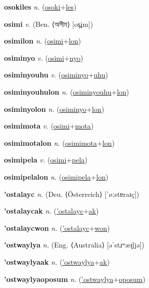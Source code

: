 \textbf{\hypertarget{osokiles}{osokiles}} \textit{n.} (\hyperlink{osoki}{osoki}+\allowbreak \hyperlink{les}{les})


\textbf{\hypertarget{osimi}{osimi}} \textit{v.} (Ben. ⟨{\bengali{}অসীম}⟩ [os̪im])


\textbf{\hypertarget{osimilon}{osimilon}} \textit{n.} (\hyperlink{osimi}{osimi}+\allowbreak \hyperlink{lon}{lon})


\textbf{\hypertarget{osiminyo}{osiminyo}} \textit{v.} (\hyperlink{osimi}{osimi}+\allowbreak \hyperlink{nyo}{nyo})


\textbf{\hypertarget{osiminyouhu}{osiminyouhu}} \textit{v.} (\hyperlink{osiminyo}{osiminyo}+\allowbreak \hyperlink{uhu}{uhu})


\textbf{\hypertarget{osiminyouhulon}{osiminyouhulon}} \textit{n.} (\hyperlink{osiminyouhu}{osiminyouhu}+\allowbreak \hyperlink{lon}{lon})


\textbf{\hypertarget{osiminyolon}{osiminyolon}} \textit{n.} (\hyperlink{osiminyo}{osiminyo}+\allowbreak \hyperlink{lon}{lon})


\textbf{\hypertarget{osimimota}{osimimota}} \textit{v.} (\hyperlink{osimi}{osimi}+\allowbreak \hyperlink{mota}{mota})


\textbf{\hypertarget{osimimotalon}{osimimotalon}} \textit{n.} (\hyperlink{osimimota}{osimimota}+\allowbreak \hyperlink{lon}{lon})


\textbf{\hypertarget{osimipela}{osimipela}} \textit{v.} (\hyperlink{osimi}{osimi}+\allowbreak \hyperlink{pela}{pela})


\textbf{\hypertarget{osimipelalon}{osimipelalon}} \textit{n.} (\hyperlink{osimipela}{osimipela}+\allowbreak \hyperlink{lon}{lon})


\textbf{\hypertarget{'ostalayc}{'ostalayc}} \textit{n.} (Deu. ⟨Österreich⟩ [ˈøːstɐraɪç])


\textbf{\hypertarget{'ostalaycak}{'ostalaycak}} \textit{n.} (\hyperlink{'ostalayc}{'ostalayc}+\allowbreak \hyperlink{ak}{ak})


\textbf{\hypertarget{'ostalaycwon}{'ostalaycwon}} \textit{n.} (\hyperlink{'ostalayc}{'ostalayc}+\allowbreak \hyperlink{won}{won})


\textbf{\hypertarget{'ostwaylya}{'ostwaylya}} \textit{n.} (Eng. ⟨Australia⟩ [əˈstɹʷæɪ̯ljə])


\textbf{\hypertarget{'ostwaylyaak}{'ostwaylyaak}} \textit{n.} (\hyperlink{'ostwaylya}{'ostwaylya}+\allowbreak \hyperlink{ak}{ak})


\textbf{\hypertarget{'ostwaylyaoposum}{'ostwaylyaoposum}} \textit{n.} (\hyperlink{'ostwaylya}{'ostwaylya}+\allowbreak \hyperlink{oposum}{oposum})


